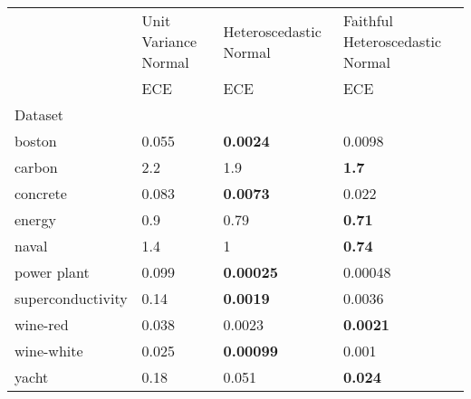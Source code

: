 \begin{tabular}{l|l|l|l}
\toprule
 & Unit Variance Normal & Heteroscedastic Normal & Faithful Heteroscedastic Normal \\
 & ECE & ECE & ECE \\
Dataset &  &  &  \\
\midrule
boston & 0.055 & \bfseries 0.0024 & 0.0098 \\
carbon & 2.2 & 1.9 & \bfseries 1.7 \\
concrete & 0.083 & \bfseries 0.0073 & 0.022 \\
energy & 0.9 & 0.79 & \bfseries 0.71 \\
naval & 1.4 & 1 & \bfseries 0.74 \\
power plant & 0.099 & \bfseries 0.00025 & 0.00048 \\
superconductivity & 0.14 & \bfseries 0.0019 & 0.0036 \\
wine-red & 0.038 & 0.0023 & \bfseries 0.0021 \\
wine-white & 0.025 & \bfseries 0.00099 & 0.001 \\
yacht & 0.18 & 0.051 & \bfseries 0.024 \\
\bottomrule
\end{tabular}
